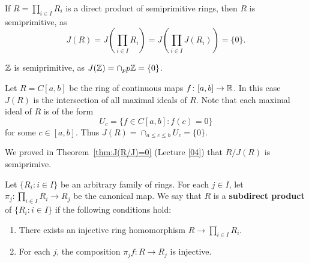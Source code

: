 \begin{example}
	If $R=\prod_{i\in I}R_i$ is a direct product of semiprimitive rings, then
	$R$ is semiprimitive, as 
	\[
		J(R)=J\left(\prod_{i\in I}R_i\right)=J\left(\prod_{i\in I}J(R_i)\right)=\{0\}.
	\]
\end{example}

\begin{example}
$\mathbb{Z}$ is semiprimitive, as $J(\mathbb{Z})=\cap_{p}p\mathbb{Z}=\{0\}$.
\end{example}

\begin{example}
	\label{exa:C[a,b]}
	Let $R=C[a,b]$ be the ring of continuous maps $f\colon [a,b]\to\mathbb{R}$. 
	In this case $J(R)$ is the intersection of all maximal ideals of $R$. Note that 
	each maximal ideal of $R$ is of the form 
	\[
		U_c=\{f\in C[a,b]:f(c)=0\}
	\]
	for some $c\in[a,b]$. 
	Thus $J(R)=\cap_{a\leq c\leq
	b}U_c=\{0\}$.
\end{example}

We proved in Theorem~\ref{thm:J(R/J)=0} (Lecture \ref{04}) 
that $R/J(R)$ is semiprimive. 

%
%



\begin{definition}
    Let $\{R_i:i\in I\}$ be an arbitrary family of rings. For each 
    $j\in I$, let $\pi_j\colon \prod_{i\in I}R_i\to R_j$ be the
    canonical map. We say that $R$ is a \textbf{subdirect product}
    of $\{R_i:i\in I\}$ if the following conditions hold:
    \begin{enumerate}
        \item There exists an injective ring homomorphism $R\to \prod_{i\in I}R_i$. 
        \item For each $j$, the composition 
        $\pi_jf\colon R\to R_j$ is injective. 
    \end{enumerate}
\end{definition}

